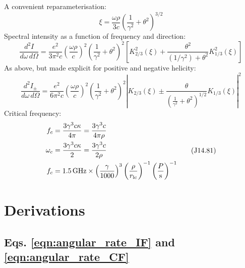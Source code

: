\documentclass{book}
\newcommand{\rL}{r_\text{lc}} %
\begin{document}
A convenient reparameterisation:
\begin{equation}
    \xi = \frac{\omega\rho}{3c}\left(\frac{1}{\gamma^2} + \theta^2\right)^{3/2}
    \tag{J14.76}
\end{equation}
Spectral intensity as a function of frequency and direction:
\begin{equation}
    \frac{d^2I}{d\omega\,d\Omega} =
        \frac{e^2}{3\pi^2c}
        \left( \frac{\omega\rho}{c} \right)^2
        \left( \frac{1}{\gamma^2} + \theta^2 \right)^2
        \left[ K_{2/3}^2(\xi) + \frac{\theta^2}{(1/\gamma^2) + \theta^2} K_{1/3}^2(\xi) \right]
    \tag{J14.79}
\end{equation}
As above, but made explicit for positive and negative helicity:
\begin{equation}
    \frac{d^2I_\pm}{d\omega\,d\Omega} =
        \frac{e^2}{6\pi^2c}
        \left( \frac{\omega\rho}{c} \right)^2
        \left( \frac{1}{\gamma^2} + \theta^2 \right)^2
        \left| K_{2/3}(\xi) \pm \frac{\theta}{\left(\frac{1}{\gamma^2} + \theta^2\right)^{1/2}} K_{1/3}(\xi) \right|^2
    \tag{J Problem 14.25}
    \label{eqn:JP14_25}
\end{equation}
Critical frequency:
\begin{equation}
    \begin{aligned}
        f_c &= \frac{3\gamma^3 c\kappa}{4\pi}
             = \frac{3\gamma^3 c}{4\pi\rho} \\
        \omega_c &= \frac{3\gamma^3 c\kappa}{2}
                  = \frac{3\gamma^3 c}{2\rho} \\
        f_c &= 1.5\text{\,GHz} \times \left(\frac{\gamma}{1000}\right)^3 \left(\frac{\rho}{\rL}\right)^{-1} \left(\frac{P}{\text{s}}\right)^{-1}
    \end{aligned}
    \tag{J14.81}
\end{equation}

\appendix

\chapter{Derivations}

\section{Eqs. \eqref{eqn:angular_rate_IF} and \eqref{eqn:angular_rate_CF}}
\end{document}
